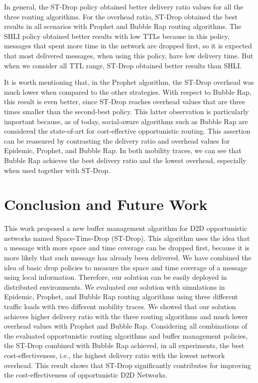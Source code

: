 In general, the ST-Drop policy obtained better delivery ratio values for all the three routing algorithms. For the overhead ratio, ST-Drop obtained the best results in all
scenarios with Prophet and Bubble Rap routing algorithms. The SHLI policy obtained better results with low TTLs because in this policy, messages that spent more time in the
network are dropped first, so it is expected that most delivered messages, when using this policy, have low delivery time. But when we consider all TTL range, ST-Drop obtained
better results than SHLI.

It is worth mentioning that, in the Prophet algorithm, the ST-Drop overhead was much lower when compared to the other strategies. With respect to Bubble Rap, this result is
even better, since ST-Drop reaches overhead values that are three times smaller than the second-best policy. This latter observation is particularly important because, as of today,
social-aware algorithms such as Bubble Rap are considered the state-of-art for cost-effective opportunistic routing. This assertion can be reassured by contrasting the delivery
ratio and overhead values for Epidemic, Prophet, and Bubble Rap. In both mobility traces, we can see that Bubble Rap achieves the best delivery ratio and the lowest overhead,
especially when used together with ST-Drop.

\section{Conclusion and Future Work}
\label{sec:conclusion}

This work proposed a new buffer management algorithm for D2D opportunistic networks named Space-Time-Drop (ST-Drop). This algorithm uses the idea that a message with
more space and time coverage can be dropped first, because it is more likely that such message has already been delivered. We have combined the idea of basic drop policies
to measure the space and time coverage of a message using local information. Therefore, our solution can be easily deployed in distributed environments. We evaluated
our solution with simulations in Epidemic, Prophet, and Bubble Rap routing algorithms using three different traffic loads with two different mobility traces. We showed
that our solution achieves higher delivery ratio with the three routing algorithms and much lower overhead values with Prophet and Bubble Rap. Considering all combinations of
the evaluated opportunistic routing algorithms and buffer management policies, the ST-Drop combined with Bubble Rap achieved, in all experiments, the best cost-effectiveness, i.e.,
the highest delivery ratio with the lowest network overhead. This result shows that ST-Drop significantly contributes for improving the cost-effectiveness of opportunistic D2D Networks.

